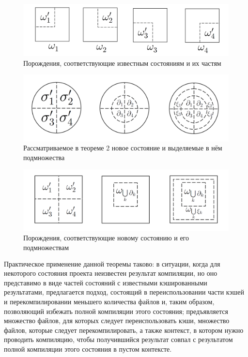 \begin{figure}[h]
	\centering
	\includegraphics[width=160mm]{theorem2_dst.png}
	\caption{Порождения, соответствующие известным состояниям и их частям}
	\label{fig:theorem2_dst}
\end{figure}

\begin{figure}[h]
	\centering
	\includegraphics[width=160mm]{theorem2_srcn.png}
	\caption{Рассматриваемое в теореме 2 новое состояние и выделяемые в нём подмножества}
	\label{fig:theorem2_srcn}
\end{figure}

\begin{figure}[h]
	\centering
	\includegraphics[width=160mm]{theorem2_dstn.png}
	\caption{Порождения, соответствующие новому состоянию и его подмножествам}
	\label{fig:theorem2_dstn}
\end{figure}

Практическое применение данной теоремы таково: в ситуации, когда для некоторого состояния проекта неизвестен результат компиляции, но оно представимо в виде частей состояний с известными кэшированными результатами, предлагается подход, состоящий в переиспользовании части кэшей и перекомпилировании меньшего количества файлов и, таким образом, позволяющий избежать полной компиляции этого состояния; предъявляется множество файлов, для которых следует переиспользовать кэши, множество файлов, которые следует перекомпилировать, а также контекст, в котором нужно проводить компиляцию, чтобы получившийся результат совпал с результатом полной компиляции этого состояния в пустом контексте.

